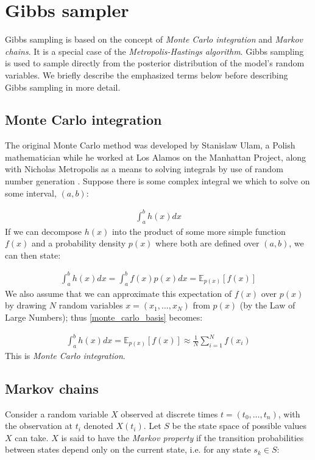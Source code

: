 \documentclass[11pt]{article} %
\begin{document}
\section{Gibbs sampler}
Gibbs sampling is based on the concept of \emph{Monte Carlo integration} and \emph{Markov chains}. It is a special case of the \emph{Metropolis-Hastings algorithm}. Gibbs sampling is used to sample directly from the posterior distribution of the model's random variables. We briefly describe the emphasized terms below before describing Gibbs sampling in more detail.

\subsection{Monte Carlo integration}
The original Monte Carlo method was developed by Stanislaw Ulam, a Polish mathematician while he worked at Los Alamos on the Manhattan Project, along with Nicholas Metropolis \cite{CooperCardinalsChaosReflection1989} as a means to solving integrals by use of random number generation \cite{MetropolisMonteCarloMethod1949}. Suppose there is some complex integral we which to solve on some interval, $(a,b)$:

\begin{align}
\int_a^b h(x) dx
\end{align}
If we can decompose $h(x)$ into the product of some more simple function $f(x)$ and a probability density $p(x)$ where both are defined over $(a,b)$, we can then state:

\begin{align} \label{monte_carlo_basis}
\int_a^bh(x)dx = \int_a^bf(x)p(x)dx = \mathbb{E}_{p(x)}\left[f(x)\right]
\end{align}
We also assume that we can approximate this expectation of $f(x)$ over $p(x)$ by drawing $N$ random variables $x = (x_1,\ldots,x_N)$ from $p(x)$ (by the Law of Large Numbers); thus \eqref{monte_carlo_basis} becomes:

\begin{align} \label{monte_carlo_integration}
\int_a^bh(x)dx = \mathbb{E}_{p(x)}\left[f(x)\right] \approx \frac{1}{N}\sum_{i=1}^Nf(x_i)
\end{align}
This is \emph{Monte Carlo integration}.

\subsection{Markov chains}
Consider a random variable $X$ observed at discrete times $t = (t_0,\ldots,t_n)$, with the observation at $t_i$ denoted $X(t_i)$. Let $S$ be the state space of possible values $X$ can take. $X$ is said to have the \emph{Markov property} if the transition probabilities between states depend only on the current state, i.e. for any state $s_k \in S$:
\end{document}

